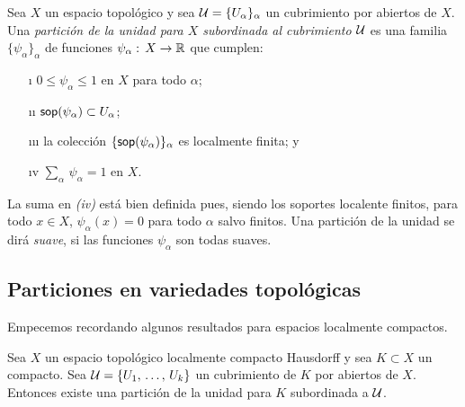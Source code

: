 Sea $X$ un espacio topol\'{o}gico y sea $\cal{U}=\{U_{\alpha}\}_{\alpha}$
un cubrimiento por abiertos de $X$. Una \emph{partici\'{o}n de la unidad %
para $X$ subordinada al cubrimiento $\cal{U}$} es una familia
$\{\psi_{\alpha}\}_{\alpha}$ de funciones $\psi_{\alpha}:\, X\rightarrow\bb{R}$
que cumplen:
\begin{itemize}
	\item[\i] $0\leq \psi_{\alpha}\leq 1$ en $X$ para todo $\alpha$;
	\item[\i\i] $\soporte{\psi_{\alpha}}\subset U_{\alpha}$;
	\item[\i\i\i] la colecci\'{o}n $\{\soporte{\psi_{\alpha}}\}_{\alpha}$
		es localmente finita; y
	\item[\i v] $\sum_{\alpha}\,\psi_{\alpha} =1$ en $X$.
\end{itemize}
%
La suma en \textit{(iv)} est\'{a} bien definida pues, siendo los soportes
localente finitos, para todo $x\in X$, $\psi_{\alpha}(x)=0$ para todo
$\alpha$ salvo finitos. Una partici\'{o}n de la unidad se dir\'{a}
\emph{suave}, si las funciones $\psi_{\alpha}$ son todas suaves.

\subsection{Particiones en variedades topol\'{o}gicas}
Empecemos recordando algunos resultados para espacios localmente compactos.

\begin{propoParticionesLCH}\label{thm:particioneslch}
	Sea $X$ un espacio topol\'{o}gico localmente compacto Hausdorff y sea
	$K\subset X$ un compacto. Sea $\cal{U}=\{\lista{U}{k}\}$ un
	cubrimiento de $K$ por abiertos de $X$. Entonces existe una
	partici\'{o}n de la unidad para $K$ subordinada a $\cal{U}$.
\end{propoParticionesLCH}


